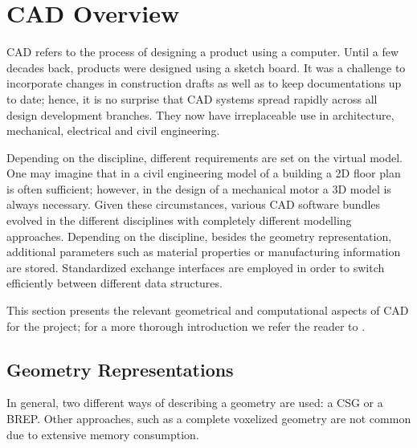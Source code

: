\section{CAD Overview}
\label{sec:CADbackg}
\Acf{CAD} refers to the process of designing a product using a computer. Until a few decades back, products were designed using a sketch board. It was a challenge to incorporate changes in construction drafts as well as to keep documentations up to date; hence, it is no surprise that \ac{CAD} systems spread rapidly across all design development branches. They now have irreplaceable use in architecture, mechanical, electrical and civil engineering.

Depending on the discipline, different requirements are set on the virtual model. One may imagine that in a civil engineering model of a building a 2D floor plan is often sufficient; however, in the design of a mechanical motor a 3D model is always necessary. Given these circumstances, various \ac{CAD} software bundles evolved in the different disciplines with completely different modelling approaches. Depending on the discipline, besides the geometry representation, additional parameters such as material properties or manufacturing information are stored. Standardized exchange interfaces are employed in order to switch efficiently between different data structures. 

This section presents the relevant geometrical and computational aspects of \ac{CAD} for the project; for a more thorough introduction we refer the reader to \cite{sarcarCAD}.

\subsection{Geometry Representations}
In general, two different ways of describing a geometry are used: a \acf{CSG} or a \acf{BREP}. Other approaches, such as a complete voxelized geometry are not common due to extensive memory consumption.
